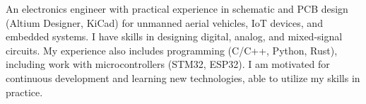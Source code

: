 
An electronics engineer with practical experience in schematic and PCB design (Altium Designer, KiCad) for unmanned aerial vehicles, IoT devices, and embedded systems. I have skills in designing digital, analog, and mixed-signal circuits. My experience also includes programming (C/C++, Python, Rust), including work with microcontrollers (STM32, ESP32). I am motivated for continuous development and learning new technologies, able to utilize my skills in practice.

